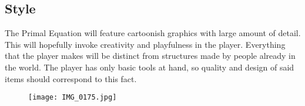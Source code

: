 \documentclass[a4paper,10pt,english]{article}
\newcommand{\ph}[1]{\textit{[#1]}}
\begin{document}
\subsection*{Style}
The Primal Equation will feature cartoonish graphics with large amount of detail. This will hopefully invoke creativity and playfulness in the player. Everything that the player makes will be distinct from structures made by people already in the world. The player has only basic tools at hand, so quality and design of said items should correspond to this fact.

\begin{figure}
    \centering
    \texttt{[image: IMG\_0175.jpg]}
\end{figure}





\end{document}
